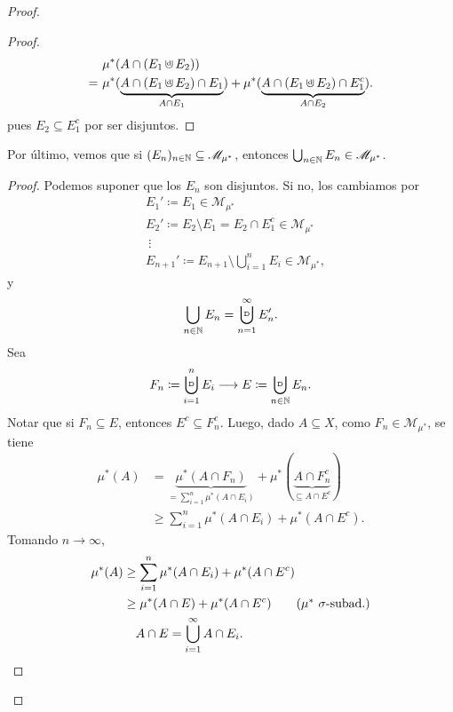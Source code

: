 \begin{proof}
\begin{enumerate}
\begin{proof}
\begin{align*}
				& \mu^{*}(A \cap (E_1 \cupd E_2)) \\
				= \ & \mu^{*}(\underbrace{A \cap (E_1 \cupd E_2) \cap E_1}_{A \cap E_1}) + \mu^{*}(\underbrace{A \cap (E_1 \cupd E_2) \cap E_1^c}_{A \cap E_2}) 
			.\end{align*}
			pues $E_2 \subseteq E_1^c$ por ser disjuntos.
		\end{proof}
		Por último, vemos que si $(E_n)_{n\in\mathbb{N}} \subseteq \mathscr{M}_{\mu^{*}}$, entonces $\bigcup_{n\in\mathbb{N}} E_n \in \mathscr{M}_{\mu^{*}}$.
		\begin{proof}
			Podemos suponer que los $E_n$ son disjuntos. Si no, los cambiamos por
			\begin{align*}
				& E_{1}' \coloneq E_{1} \in \mathscr{M}_{\mu^{*}} \\
				& E_{2}' \coloneq E_{2} \setminus E_{1} = E_2 \cap E_1^c \in \mathscr{M}_{\mu^{*}} \\
				& \ \vdots \\
				& E_{n+1}' \coloneq E_{n+1} \setminus \bigcup_{i=1}^{n} E_i \in \mathscr{M}_{\mu^{*}}
			,\end{align*}
			y 
			\[ \displaystyle\bigcup_{n\in\N} E_n = \displaystyle\bigcupd_{n=1}^{\infty} E_{n}'. \]
			Sea 
			\[ F_n \coloneq \displaystyle\bigcupd_{i=1}^{n} E_i \longrightarrow E \coloneq \displaystyle\bigcupd_{n\in\N} E_n. \]
			Notar que si $F_n \subseteq E$, entonces $E^c \subseteq F_{n}^{c}$. Luego, dado $A \subseteq X$, como $F_n \in \mathscr{M}_{\mu^{*}}$, se tiene
			\begin{align*}
				\mu^{*}(A) &= \underbrace{\mu^{*}(A \cap F_n)}_{= \sum_{i=1}^{n} \mu^{*}(A \cap E_i)} + \mu^{*}(\underbrace{A \cap F_{n}^{c}}_{\subseteq A \cap E^c}) \\
				& \geq \sum_{i=1}^{n} \mu^{*}(A \cap E_i) + \mu^{*}(A \cap E^c)
			.\end{align*}
			Tomando $n \to \infty$,
			\begin{align*}
				\mu^{*}(A) & \geq \sum_{i=1}^{n} \mu^{*}(A \cap E_i) + \mu^{*}(A \cap E^c) \\
				& \geq \mu^{*}(A \cap E) + \mu^{*}(A \cap E^c) \tag{$\mu^{*}\ \sigma$-subad.} \\
				& \quad A \cap E = \bigcup_{i=1}^{\infty} A \cap E_i
			.\end{align*}
		\end{proof}
	\end{enumerate}
\end{proof}
